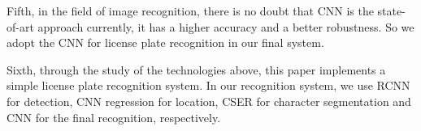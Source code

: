 \begin{enabstract}
Fifth, in the field of image recognition, there is no doubt that CNN is the
state-of-art approach currently, it has a higher accuracy and a better
robustness. So we adopt the CNN for license plate recognition in our final
system.

Sixth, through the study of the technologies above, this paper implements a
simple license plate recognition system. In our recognition system, we use RCNN
for detection, CNN regression for location, CSER for character segmentation and
CNN for the final recognition, respectively.
\end{enabstract}
